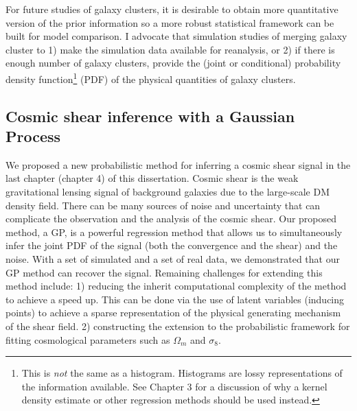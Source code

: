 % 
% 

For future studies of galaxy clusters, 
it is desirable to obtain more quantitative version of the 
prior information so a more robust statistical framework can be built for model
comparison. 
I advocate that simulation studies of merging galaxy cluster  
to 1) make the simulation data available for reanalysis, or 2) if there is
enough number of galaxy clusters, provide  the
(joint or conditional) probability density function\footnote{This is {\it not}
the same as a histogram. Histograms are lossy representations of the information 
available. See Chapter 3 for a discussion of why a kernel density estimate or
other regression methods should be used instead.} (PDF) of the physical quantities
of galaxy clusters. 

\subsection{Cosmic shear inference with a Gaussian Process}
We proposed a new probabilistic method
for inferring a cosmic shear signal in the last chapter (chapter 4) of this dissertation. 
Cosmic shear is the weak 
gravitational lensing signal of background galaxies due to the large-scale DM density field. 
There can be many sources of noise and uncertainty that can complicate the observation and
the analysis of the cosmic shear. 
Our proposed method, a GP, is a powerful regression method that
allows us to simultaneously infer the joint PDF of the signal (both the convergence and the shear)
and the noise. 
With a set of simulated and a set of real data, we demonstrated that our GP
method can recover the signal.  
Remaining challenges for extending this method include: 1) reducing the
inherit computational complexity of the method to achieve a speed up. This can
be done via the use of latent variables (inducing points) to achieve a sparse representation of
the physical generating mechanism of the shear field.  
2) constructing the extension to the probabilistic 
framework for fitting cosmological parameters such as $\Omega_m$ and
$\sigma_8$.


